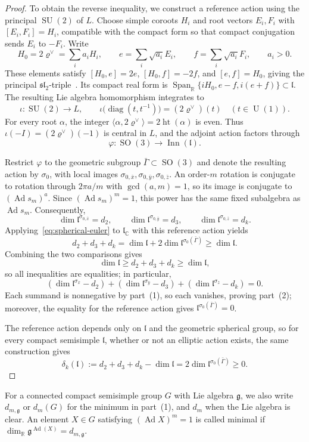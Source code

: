 \documentclass[11pt,a4paper,reqno]{amsart}
\theoremstyle{plain}
\theoremstyle{definition}
\theoremstyle{remark}
\numberwithin{equation}{section}
\DeclareMathOperator{\Ad}{Ad}
\DeclareMathOperator{\rootht}{ht}
\DeclareMathOperator{\SO}{SO}
\newcommand{\SU}{\operatorname{SU}}
\newcommand{\UU}{\operatorname{U}}
\newcommand{\CC}{\mathbb C}
\newcommand{\RR}{\mathbb R}
\newcommand{\fg}{\mathfrak g}
\newcommand{\fl}{\mathfrak l}
\newcommand{\pair}[2]{\langle #1,#2\rangle}
\newcommand{\rh}{\varrho^\vee}
\begin{document}
\begin{proof}
To obtain the reverse inequality, we construct a reference action using the principal $\SU(2)$ of $L$. Choose simple coroots $H_i$ and root vectors $E_i,F_i$ with $[E_i,F_i]=H_i$, compatible with the compact form so that compact conjugation sends $E_i$ to $-F_i$. Write
\[
H_0=2\rh=\sum_i a_iH_i,\qquad
e=\sum_i\sqrt{a_i}E_i,\qquad
f=\sum_i\sqrt{a_i}F_i,
\qquad a_i>0.
\]
These elements satisfy $[H_0,e]=2e$, $[H_0,f]=-2f$, and $[e,f]=H_0$, giving the principal $\mathfrak{sl}_2$-triple~\cite[\S32.3]{EtingofExponents}. Its compact real form is $\operatorname{Span}_{\RR}\{iH_0,e-f,i(e+f)\}\subset\fl$. The resulting Lie algebra homomorphism integrates to
\[
\iota\colon\SU(2)\longrightarrow L,\qquad
\iota\bigl(\operatorname{diag}(t,t^{-1})\bigr)
=(2\rh)(t)\quad(t\in\UU(1)).
\]
For every root $\alpha$, the integer $\pair{\alpha}{2\rh}=2\rootht(\alpha)$ is even. Thus $\iota(-I)=(2\rh)(-1)$ is central in $L$, and the adjoint action factors through
\[
\varphi\colon\SO(3)\longrightarrow\operatorname{Inn}(\fl).
\]

Restrict $\varphi$ to the geometric subgroup $\bar\Gamma\subset\SO(3)$ and denote the resulting action by $\sigma_0$, with local images $\sigma_{0,\bar x},\sigma_{0,\bar y},\sigma_{0,\bar z}$. An order-$m$ rotation is conjugate to rotation through $2\pi a/m$ with $\gcd(a,m)=1$, so its image is conjugate to $(\Ad s_m)^a$. Since $(\Ad s_m)^m=1$, this power has the same fixed subalgebra as $\Ad s_m$. Consequently,
\[
\dim\fl^{\sigma_{0,\bar x}}=d_2,\qquad
\dim\fl^{\sigma_{0,\bar y}}=d_3,\qquad
\dim\fl^{\sigma_{0,\bar z}}=d_k.
\]
Applying~\eqref{eq:spherical-euler} to $\fl_{\CC}$ with this reference action yields
\[
d_2+d_3+d_k
=\dim\fl+2\dim\fl^{\sigma_0(\bar\Gamma)}
\ge\dim\fl.
\]
Combining the two comparisons gives
\[
\dim\fl\ge d_2+d_3+d_k\ge\dim\fl,
\]
so all inequalities are equalities; in particular,
\[
(\dim\fl^{\sigma_{\bar x}}-d_2)
+(\dim\fl^{\sigma_{\bar y}}-d_3)
+(\dim\fl^{\sigma_{\bar z}}-d_k)=0.
\]
Each summand is nonnegative by part~(1), so each vanishes, proving part~(2); moreover, the equality for the reference action gives $\fl^{\sigma_0(\bar\Gamma)}=0$.

The reference action depends only on $\fl$ and the geometric spherical group, so for every compact semisimple $\fl$, whether or not an elliptic action exists, the same construction gives
\[
\delta_k(\fl):=d_2+d_3+d_k-\dim\fl
=2\dim\fl^{\sigma_0(\bar\Gamma)}\ge0.
\]
\end{proof}

For a connected compact semisimple group $G$ with Lie algebra $\fg$, we also write $d_{m,\fg}$ or $d_m(G)$ for the minimum in part~(1), and $d_m$ when the Lie algebra is clear. An element $X\in G$ satisfying $(\Ad X)^m=1$ is called minimal if $\dim_{\RR}\fg^{\Ad(X)}=d_{m,\fg}$.
\end{document}
